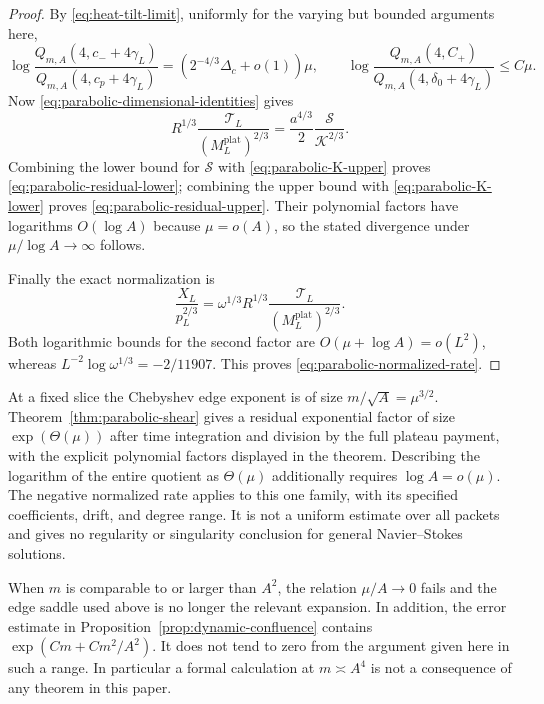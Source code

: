 \begin{proof}
By \eqref{eq:heat-tilt-limit}, uniformly for the varying but bounded
arguments here,
\[
 \log\frac{Q_{m,A}(4,c_-+4\gamma_L)}
              {Q_{m,A}(4,c_p+4\gamma_L)}
     =(2^{-4/3}\Delta_c+o(1))\mu,
 \qquad
 \log\frac{Q_{m,A}(4,C_+)}{Q_{m,A}(4,\delta_0+4\gamma_L)}
     \le C\mu.
\]
Now \eqref{eq:parabolic-dimensional-identities} gives
\[
 R^{1/3}\frac{\mathcal T_L}{(M_L^{\mathrm{plat}})^{2/3}}
     =\frac{a^{4/3}}2\frac{\mathcal S}{\mathcal K^{2/3}}.
\]
Combining the lower bound for $\mathcal S$ with
\eqref{eq:parabolic-K-upper} proves
\eqref{eq:parabolic-residual-lower}; combining the upper bound with
\eqref{eq:parabolic-K-lower} proves
\eqref{eq:parabolic-residual-upper}.  Their polynomial factors have
logarithms $O(\log A)$ because $\mu=o(A)$, so the stated divergence
under $\mu/\log A\to\infty$ follows.

Finally the exact normalization is
\[
 \frac{X_L}{p_L^{2/3}}
  =\omega^{1/3}R^{1/3}
       \frac{\mathcal T_L}{(M_L^{\mathrm{plat}})^{2/3}}.
\]
Both logarithmic bounds for the second factor are
$O(\mu+\log A)=o(L^2)$, whereas
$L^{-2}\log\omega^{1/3}=-2/11907$.
This proves \eqref{eq:parabolic-normalized-rate}.
\end{proof}

\begin{remark}
At a fixed slice the Chebyshev edge exponent is of size
$m/\sqrt A=\mu^{3/2}$.  Theorem~\ref{thm:parabolic-shear} gives a
residual exponential factor of size $\exp(\Theta(\mu))$ after time
integration and division by the full plateau payment, with the explicit
polynomial factors displayed in the theorem.  Describing the logarithm
of the entire quotient as $\Theta(\mu)$ additionally requires
$\log A=o(\mu)$.  The negative normalized rate applies to this one
family, with its specified coefficients, drift, and degree range.
It is not a uniform estimate over all packets and gives no regularity or
singularity conclusion for general Navier--Stokes solutions.
\end{remark}

\begin{remark}
When $m$ is comparable to or larger than $A^2$, the relation
$\mu/A\to0$ fails and the edge saddle used above is no longer the
relevant expansion.  In addition, the error estimate in
Proposition~\ref{prop:dynamic-confluence} contains
$\exp(Cm+Cm^2/A^2)$.  It does not tend to zero from the argument given
here in such a range.  In particular a formal calculation at
$m\asymp A^4$ is not a consequence of any theorem in this paper.
\end{remark}
